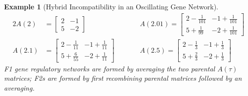 \documentclass[9 pt]{article}
\newcommand{\1}{\mathbbm{1}}
\newtheorem{example}{Example}
\begin{document}
\begin{example}[Hybrid Incompatibility in an Oscillating Gene Network]
        \begin{alignat*}{2}
          A(2) &= \left[\begin{array}{cc} 2 & -1 \\[6pt] 5 & -2 \end{array}\right] &&\qquad A(2.01) = \left[\begin{array}{cc} 2 -\frac{1}{101} & -1 + \frac{1}{101} \\[6pt] 5 + \frac{1}{99} & -2 + \frac{1}{101} \end{array}\right] \\
            A(2.1) &= \left[\begin{array}{cc} 2 - \frac{1}{11} & -1 + \frac{1}{11} \\[6pt] 5 + \frac{6}{55} & -2 + \frac{1}{11} \end{array}\right] &&\qquad A(2.5) = \left[\begin{array}{cc} 2 - \frac{1}{3} & -1 + \frac{1}{3} \\[6pt] 5 + \frac{2}{3} & -2 + \frac{1}{3} \end{array}\right]
        \end{alignat*}
        F1 gene regulatory networks are formed by averaging the two parental $A(\tau)$ matrices; F2s are formed by first recombining parental matrices followed by an averaging. 


\end{example}
\end{document}

